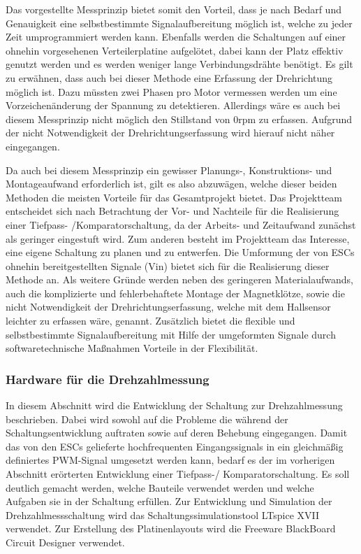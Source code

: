 Das vorgestellte Messprinzip bietet somit den Vorteil, dass je nach Bedarf und Genauigkeit eine selbstbestimmte Signalaufbereitung möglich ist, welche zu jeder Zeit umprogrammiert werden kann.  Ebenfalls werden die Schaltungen auf einer ohnehin vorgesehenen Verteilerplatine aufgelötet, dabei kann der Platz effektiv genutzt werden und es werden weniger lange Verbindungsdrähte benötigt. Es gilt zu erwähnen, dass auch bei dieser Methode eine Erfassung der Drehrichtung möglich ist. Dazu müssten zwei Phasen pro Motor vermessen werden um eine Vorzeichenänderung der Spannung zu detektieren. Allerdings wäre es auch bei diesem Messprinzip nicht möglich den Stillstand von 0rpm zu erfassen. Aufgrund der nicht Notwendigkeit der Drehrichtungserfassung wird hierauf nicht näher eingegangen.\vspace{11pt}

Da auch bei diesem Messprinzip ein gewisser Planungs-, Konstruktions- und Montageaufwand erforderlich ist, gilt es also abzuwägen, welche dieser beiden Methoden die meisten Vorteile für das Gesamtprojekt bietet. Das Projektteam entscheidet sich nach Betrachtung der Vor- und Nachteile für die Realisierung einer Tiefpass- /Komparatorschaltung, da der Arbeits- und Zeitaufwand zunächst als geringer eingestuft wird. Zum anderen besteht im Projektteam das Interesse, eine eigene Schaltung zu planen und zu entwerfen. Die Umformung der von ESCs ohnehin bereitgestellten Signale (Vin) bietet sich für die Realisierung dieser Methode an. Als weitere Gründe werden neben des geringeren Materialaufwands, auch die komplizierte und fehlerbehaftete Montage der Magnetklötze, sowie die nicht Notwendigkeit der Drehrichtungserfassung, welche mit dem Hallsensor leichter zu erfassen wäre, genannt. Zusätzlich bietet die flexible und selbstbestimmte Signalaufbereitung mit Hilfe der umgeformten Signale durch softwaretechnische Maßnahmen Vorteile in der Flexibilität.\vspace{11pt}

\subsubsection{Hardware für die Drehzahlmessung}\label{Sec4Sub5Sub3}

In diesem Abschnitt wird die Entwicklung der Schaltung zur Drehzahlmessung beschrieben. Dabei wird sowohl auf die Probleme die während der Schaltungsentwicklung auftraten sowie auf deren Behebung eingegangen. Damit das von den ESCs gelieferte hochfrequenten Eingangssignals in ein gleichmäßig definiertes PWM-Signal umgesetzt werden kann, bedarf es der im vorherigen Abschnitt erörterten Entwicklung einer Tiefpass-/ Komparatorschaltung. Es soll deutlich gemacht werden, welche Bauteile verwendet werden und welche Aufgaben sie in der Schaltung erfüllen. Zur Entwicklung und Simulation der Drehzahlmessschaltung wird das Schaltungssimulationstool LTspice XVII verwendet. Zur Erstellung des Platinenlayouts wird die Freeware BlackBoard Circuit Designer verwendet.\vspace{11pt}

